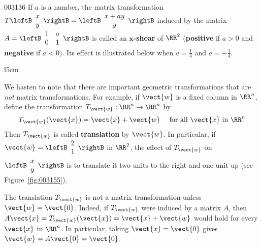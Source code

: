 \begin{example}{}{003136}
If $a$ is a number, the matrix transformation $T \leftB \begin{array}{c}
x \\
y
\end{array} \rightB = \leftB \begin{array}{c}
x + ay \\
y
\end{array} \rightB$
 induced by the matrix $A = \leftB \begin{array}{cc}
 1 & a \\
 0 & 1
 \end{array} \rightB$
 is called an $\bm{x}$\textbf{-shear} of $\RR^2$ (\textbf{positive} if $a > 0$ and \textbf{negative} if $a < 0)$. Its effect is illustrated below when $a = \frac{1}{4}$ and $a = -\frac{1}{4}$.


\begin{center}
	
\end{center}
\end{example}

\begin{wrapfigure}[8]{l}{5cm} 
        \vspace*{-2em}
	\centering
	
	\caption{\label{fig:003155}}
\end{wrapfigure}
We hasten to note that there are important geometric transformations that are \textit{not} matrix transformations. For example, if $\vect{w}$ is a fixed column in $\RR^n$, define the transformation $T_{\vect{w}} : \RR^n \to \RR^n$ by
\begin{equation*}
T_{\vect{w}}(\vect{x}) = \vect{x} + \vect{w} \quad \mbox{ for all } \vect{x} \mbox{ in } \RR^{n}
\end{equation*}
Then $T_{\vect{w}}$ is called \textbf{translation} by $\vect{w}$. In particular, if $\vect{w} = \leftB \begin{array}{r}
2 \\
1
\end{array} \rightB$
 in $\RR^2$, the effect of $T_{\vect{w}}$ on $\leftB \begin{array}{c}
x \\
y
\end{array} \rightB$
 is to translate it two units to the right and one unit up (see Figure~\ref{fig:003155}).

The translation $T_{\vect{w}}$ is not a matrix transformation unless $\vect{w} = \vect{0}$. Indeed, if $T_{\vect{w}}$ were induced by a matrix $A$, then $A\vect{x} = T_{\vect{w}}(\vect{x}) = \vect{x} + \vect{w}$ would hold for every $\vect{x}$ in $\RR^n$. In particular, taking $\vect{x} = \vect{0}$ gives $\vect{w} = A\vect{0} = \vect{0}$.

